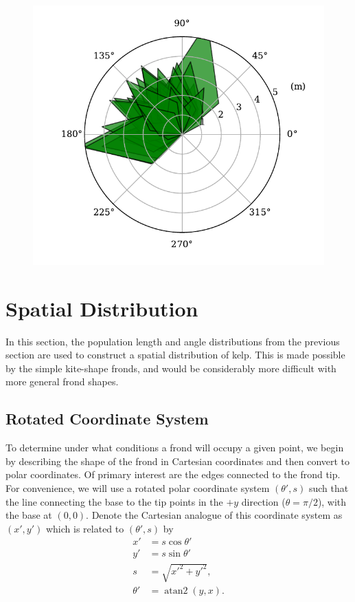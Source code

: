 \documentclass[ms,cpyr,lof,lot]{uathesis}
\DeclareMathOperator{\atantwo}{atan2}
\begin{document}
\begin{figure}[h]
	\centering
	\includegraphics[width=4.5in]{kelp_sample}
	\label{fig:kelp_sample}
\end{figure}

\section{Spatial Distribution}
In this section, the population length and angle distributions from the previous section are used to construct a spatial distribution of kelp.
This is made possible by the simple kite-shape fronds, and would be considerably more difficult with more general frond shapes.
\subsection{Rotated Coordinate System}
\label{sec:rot_coords}
To determine under what conditions a frond will occupy a given point, we begin by
describing the shape of the frond in Cartesian coordinates and then convert to polar coordinates.
Of primary interest are the edges connected to the frond tip.
For convenience, we will use a rotated polar coordinate system $(\theta',s)$ such that the line connecting the base to the tip points in the $+y$ direction ($\theta=\pi/2$), with the base at $(0,0)$.
Denote the Cartesian analogue of this coordinate system as $(x',y')$ which is related to $(\theta',s)$ by
\begin{align*}
	x' &= s\cos\theta' \\
	y' &= s\sin\theta' \\
	s &= \sqrt{x'^2+y'^2}, \\
	\theta' &= \atantwo(y, x).
\end{align*}
\end{document}
